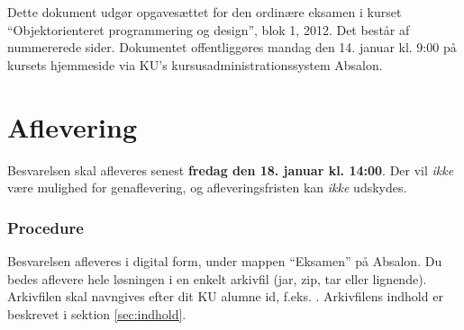Dette dokument udgør opgavesættet for den ordinære eksamen i kurset
``Objektorienteret programmering og design'', blok 1, 2012. Det består af
\pageref{LastPage} nummererede sider. Dokumentet offentliggøres mandag den 14.
januar kl. 9:00 på kursets hjemmeside via KU's kursusadministrationssystem
Absalon.



\section{Aflevering}


Besvarelsen skal afleveres senest \textbf{fredag den 18. januar kl. 14:00}. Der
vil \emph{ikke} være mulighed for genaflevering, og afleveringsfristen kan
\emph{ikke} udskydes.

\subsubsection{Procedure}

Besvarelsen afleveres i digital form, under mappen ``Eksamen'' på Absalon. Du
bedes aflevere hele løsningen i en enkelt arkivfil (jar, zip, tar eller
lignende). Arkivfilen skal navngives efter dit KU alumne id, f.eks.
. Arkivfilens indhold er beskrevet i sektion
\ref{sec:indhold}.



